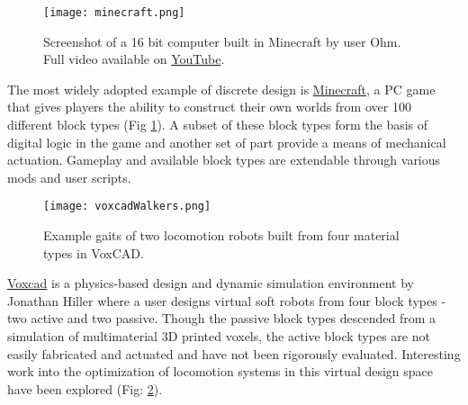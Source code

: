 {%

\begin{figure}
  \texttt{[image: minecraft.png]}
  \caption{Screenshot of a 16 bit computer built in Minecraft by user Ohm.  Full video available on \href{https://www.youtube.com/watch?v=KzrFzkb3A4o}{YouTube}.}
  \label{fig:minecraft}
\end{figure}
The most widely adopted example of discrete design is \href{https://minecraft.net/}{Minecraft}, a PC game that gives players the ability to construct their own worlds from over 100 different block types (Fig \ref{fig:minecraft}).  A subset of these block types form the basis of digital logic in the game and another set of part provide a means of mechanical actuation.  Gameplay and available block types are extendable through various mods and user scripts.
\\

\begin{figure}
  \texttt{[image: voxcadWalkers.png]}
  \caption{Example gaits of two locomotion robots built from four material types in VoxCAD\cite{Cheney2013b}.}
  \label{fig:voxcadWalkers}
\end{figure}
\href{http://www.voxcad.com/}{Voxcad} is a physics-based design and dynamic simulation environment by Jonathan Hiller where a user designs virtual soft robots from four block types - two active and two passive\cite{Hiller2014a}.  Though the passive block types descended from a simulation of multimaterial 3D printed voxels, the active block types are not easily fabricated and actuated\cite{Hiller2012} and have not been rigorously evaluated.  Interesting work into the optimization of locomotion systems in this virtual design space have been explored (Fig: \ref{fig:voxcadWalkers})\cite{Cheney2013b}\cite{Cheney2013}\cite{Cheney2015}.
\\

}

